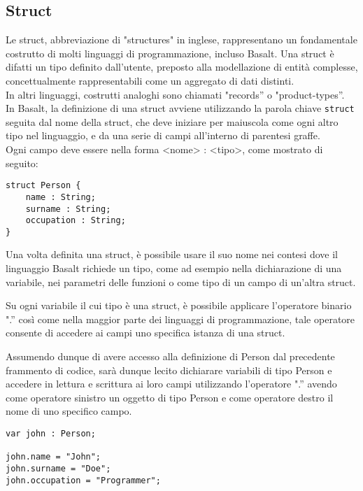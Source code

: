 \subsection{Struct}
Le struct, abbreviazione di "structures" in inglese, rappresentano un fondamentale costrutto di molti 
linguaggi di programmazione, incluso Basalt. Una struct è difatti un tipo definito dall’utente, preposto alla 
modellazione di entità complesse, concettualmente rappresentabili come un aggregato di dati distinti. \\

In altri linguaggi, costrutti analoghi sono chiamati "records” o "product-types”. \\

In Basalt, la definizione di una struct avviene utilizzando la parola chiave \texttt{struct} seguita dal nome della struct, 
che deve iniziare per maiuscola come ogni altro tipo nel linguaggio, e da una serie di campi all'interno di parentesi graffe. \\

Ogni campo deve essere nella forma <nome> : <tipo>, come mostrato di seguito:

\vspace{0.5cm}
\begin{lstlisting}[frame=single]
struct Person {
    name : String;
    surname : String;
    occupation : String;
}
\end{lstlisting}
\vspace{0.5cm}


Una volta definita una struct, è possibile usare il suo nome nei contesi dove il linguaggio Basalt richiede un tipo, come ad esempio nella dichiarazione di una variabile, nei parametri delle funzioni o come tipo di un campo di un’altra struct. 

Su ogni variabile il cui tipo è una struct, è possibile applicare l’operatore binario ".” così come nella maggior parte dei linguaggi di programmazione, tale operatore consente di accedere ai campi uno specifica istanza di una struct. 

Assumendo dunque di avere accesso alla definizione di Person dal precedente frammento di codice, sarà dunque lecito dichiarare variabili di tipo Person e accedere in lettura e scrittura ai loro campi utilizzando l’operatore ".” avendo come operatore sinistro un oggetto di tipo Person e come operatore destro il nome di uno specifico campo.

\vspace{0.5cm}
\begin{lstlisting}[frame=single]
var john : Person;

john.name = "John";
john.surname = "Doe";
john.occupation = "Programmer";
\end{lstlisting}
\vspace{0.5cm}

\newpage
 \newpage
 \newpage